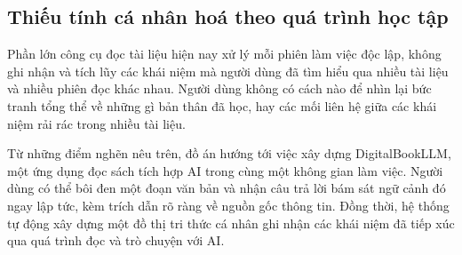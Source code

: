 \subsection{Thiếu tính cá nhân hoá theo quá trình học tập}
Phần lớn công cụ đọc tài liệu hiện nay xử lý mỗi phiên làm việc độc lập, không ghi nhận và tích lũy các khái niệm mà người dùng đã tìm hiểu qua nhiều tài liệu và nhiều phiên đọc khác nhau. Người dùng không có cách nào để nhìn lại bức tranh tổng thể về những gì bản thân đã học, hay các mối liên hệ giữa các khái niệm rải rác trong nhiều tài liệu.

Từ những điểm nghẽn nêu trên, đồ án hướng tới việc xây dựng DigitalBookLLM, một ứng dụng đọc sách tích hợp AI trong cùng một không gian làm việc. Người dùng có thể bôi đen một đoạn văn bản và nhận câu trả lời bám sát ngữ cảnh đó ngay lập tức, kèm trích dẫn rõ ràng về nguồn gốc thông tin. Đồng thời, hệ thống tự động xây dựng một đồ thị tri thức cá nhân ghi nhận các khái niệm đã tiếp xúc qua quá trình đọc và trò chuyện với AI.
